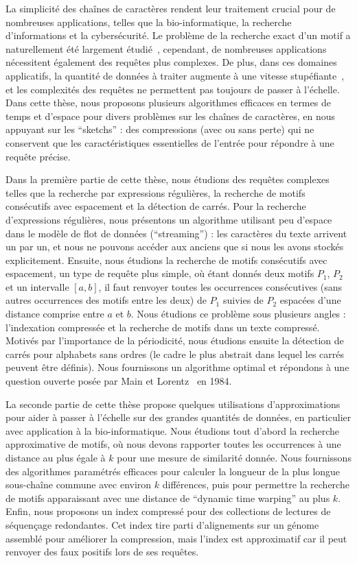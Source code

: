 La simplicité des chaînes de caractères rendent leur traitement crucial pour de nombreuses applications, telles que la bio-informatique, la recherche d'informations et la cybersécurité.
Le problème de la recherche exact d'un motif a naturellement été largement étudié~\cite{Charras2004}, cependant, de nombreuses applications nécessitent également des requêtes plus complexes. De plus, dans ces domaines applicatifs, la quantité de données à traiter augmente à une vitesse stupéfiante~\cite{muir2016real}, et les complexités des requêtes ne permettent pas toujours de passer à l'échelle.
Dans cette thèse, nous proposons plusieurs algorithmes efficaces en termes de temps et d'espace pour divers problèmes sur les chaînes de caractères, en nous appuyant sur les ``sketchs'' : des compressions (avec ou sans perte) qui ne conservent que les caractéristiques essentielles de l'entrée pour répondre à une requête précise.

Dans la première partie de cette thèse, nous étudions des requêtes complexes telles que la recherche par expressions régulières, la recherche de motifs consécutifs avec espacement et la détection de carrés.
Pour la recherche d'expressions régulières, nous présentons un algorithme utilisant peu d'espace dans le modèle de flot de données (``streaming'') : les caractères du texte arrivent un par un, et nous ne pouvons accéder aux anciens que si nous les avons stockés explicitement.
Ensuite, nous étudions la recherche de motifs consécutifs avec espacement, un type de requête plus simple, où étant donnés deux motifs $P_1$, $P_2$ et un intervalle $[a, b]$, il faut renvoyer toutes les occurrences consécutives (sans autres occurrences des motifs entre les deux) de $P_1$ suivies  de $P_2$ espacées d'une distance comprise entre $a$ et $b$. Nous étudions ce problème sous plusieurs angles : l'indexation compressée et la recherche de motifs dans un texte compressé.
Motivés par l'importance de la périodicité, nous étudions ensuite la détection de carrés pour alphabets sans ordres (le cadre le plus abstrait dans lequel les carrés peuvent être définis). Nous fournissons un algorithme optimal et répondons à une question ouverte posée par Main et Lorentz~\cite{Main1984} en 1984.

La seconde partie de cette thèse propose quelques utilisations d'approximations pour aider à passer à l'échelle sur des grandes quantités de données, en particulier avec application à la bio-informatique.
%
Nous étudions tout d'abord la recherche approximative de motifs, où nous devons rapporter toutes les occurrences à une distance au plus égale à $k$ pour une mesure de similarité donnée.
Nous fournissons des algorithmes paramétrés efficaces pour calculer la longueur de la plus longue sous-chaîne commune avec environ $k$ différences, puis pour permettre la recherche de motifs apparaissant avec une distance de ``dynamic time warping'' au plus $k$.
Enfin, nous proposons un index compressé pour des collections de lectures de séquençage redondantes. Cet index tire parti d'alignements sur un génome assemblé pour améliorer la compression, mais l'index est approximatif car il peut renvoyer des faux positifs lors de ses requêtes.